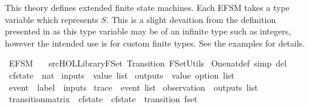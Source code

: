 %
\begin{isabellebody}%
%
%
\isadelimdocument
%
\endisadelimdocument
%
\isatagdocument
%
\isamarkuptrue%
%
\endisatagdocument
{\isafolddocument}%
%
\isadelimdocument
%
\endisadelimdocument
%
\begin{isamarkuptext}%
This theory defines extended finite state machines. Each EFSM takes a type variable which represents
$S$. This is a slight devaition from the definition presented in \cite{foster2018} as this
type variable may be of an infinite type such as integers, however the intended use is for custom
finite types. See the examples for details.%
\end{isamarkuptext}\isamarkuptrue%
%
\isadelimtheory
%
\endisadelimtheory
%
\isatagtheory
{}\isamarkupfalse%
\ EFSM\isanewline
\ \ \ {\isachardoublequoteopen}{\isachartilde}{\isachartilde}{\isacharslash}src{\isacharslash}HOL{\isacharslash}Library{\isacharslash}FSet{\isachardoublequoteclose}\ Transition\ FSet{\isacharunderscore}Utils\isanewline
{}%
\endisatagtheory
{\isafoldtheory}%
%
\isadelimtheory
%
\endisadelimtheory
\isanewline
\isanewline
{}\isamarkupfalse%
\ One{\isacharunderscore}nat{\isacharunderscore}def\ {\isacharbrackleft}simp\ del{\isacharbrackright}\isanewline
\isanewline
{}\isamarkupfalse%
\ cfstate\ {\isacharequal}\ nat\isanewline
{}\isamarkupfalse%
\ inputs\ {\isacharequal}\ {\isachardoublequoteopen}value\ list{\isachardoublequoteclose}\isanewline
{}\isamarkupfalse%
\ outputs\ {\isacharequal}\ {\isachardoublequoteopen}value\ option\ list{\isachardoublequoteclose}\isanewline
\isanewline
{}\isamarkupfalse%
\ event\ {\isacharequal}\ {\isachardoublequoteopen}{\isacharparenleft}label\ {\isasymtimes}\ inputs{\isacharparenright}{\isachardoublequoteclose}\isanewline
{}\isamarkupfalse%
\ trace\ {\isacharequal}\ {\isachardoublequoteopen}event\ list{\isachardoublequoteclose}\isanewline
{}\isamarkupfalse%
\ observation\ {\isacharequal}\ {\isachardoublequoteopen}outputs\ list{\isachardoublequoteclose}\isanewline
{}\isamarkupfalse%
\ transition{\isacharunderscore}matrix\ {\isacharequal}\ {\isachardoublequoteopen}{\isacharparenleft}{\isacharparenleft}cfstate\ {\isasymtimes}\ cfstate{\isacharparenright}\ {\isasymtimes}\ transition{\isacharparenright}\ fset{\isachardoublequoteclose}\isanewline

\end{isabellebody}
